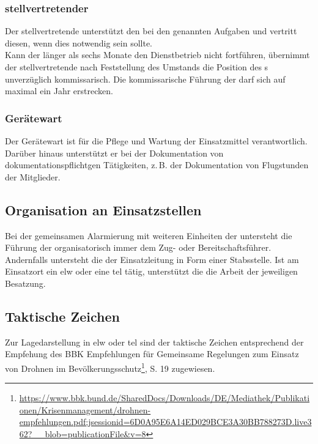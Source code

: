 \subsubsection{stellvertretender \gruppenfuehrer{}}

Der stellvertretende \gruppenfuehrer{} unterstützt den \gruppenfuehrer{} bei den genannten Aufgaben und vertritt diesen, wenn dies notwendig sein sollte.\\

\noindent Kann der \gruppenfuehrer{} länger als sechs Monate den Dienstbetrieb nicht fortführen, übernimmt der stellvertretende \gruppenfuehrer{} nach Feststellung des Umstands die Position des \gruppenfuehrer{}s unverzüglich kommissarisch. Die kommissarische Führung der \callee{} darf sich auf maximal ein Jahr erstrecken.

\subsubsection{Gerätewart}

Der Gerätewart ist für die Pflege und Wartung der Einsatzmittel verantwortlich. Darüber hinaus unterstützt er bei der Dokumentation von dokumentationspflichtgen Tätigkeiten, z.\,B. der Dokumentation von Flugstunden der Mitglieder.

\subsection{Organisation an Einsatzstellen}

Bei der gemeinsamen Alarmierung mit weiteren Einheiten der \unit{} untersteht die Führung der \callee{} organisatorisch immer dem Zug- oder Bereitschaftsführer.\\

\noindent Andernfalls untersteht die \callee{} der Einsatzleitung in Form einer Stabsstelle. Ist am Einsatzort ein \ac{elw} oder eine \ac{tel} tätig, unterstützt die \callee{} die Arbeit der jeweiligen Besatzung.

\subsection{Taktische Zeichen}

Zur Lagedarstellung in \ac{elw} oder \ac{tel} sind der \callee{} taktische Zeichen entsprechend der Empfehung des BBK Empfehlungen für \flq Gemeinsame Regelungen zum Einsatz von Drohnen im Bevölkerungsschutz\frq{}\footnote{\url{https://www.bbk.bund.de/SharedDocs/Downloads/DE/Mediathek/Publikationen/Krisenmanagement/drohnen-empfehlungen.pdf;jsessionid=6D0A95E6A14ED029BCE3A30BB788273D.live362?__blob=publicationFile&v=8}}, S. 19 zugewiesen.\\

